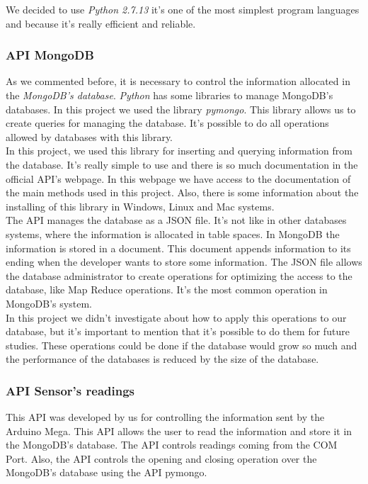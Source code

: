 We decided to use \textit{Python 2.7.13} it's one of the most simplest program languages and because it's really efficient and reliable.

\subsubsection{API MongoDB}

As we commented before, it is necessary to control the information allocated in the \textit{MongoDB's database}. \textit{Python} has some libraries to manage MongoDB's databases. In this project we used the library \textit{pymongo}. This library allows us to create queries for managing the database. It's possible to do all operations allowed by databases with this library.\\

In this project, we used this library for inserting and querying information from the database. It's really simple to use and there is so much documentation in the official API's webpage. In this webpage we have access to the documentation of the main methods used in this project. Also, there is some information about the installing of this library in Windows, Linux and Mac systems.\\

The API manages the database as a JSON file. It's not like in other databases systems, where the information is allocated in table spaces. In MongoDB the information is stored in a document. This document appends information to its ending when the developer wants to store some information. The JSON file allows the database administrator to create operations for optimizing the access to the database, like Map Reduce operations. It's the most common operation in MongoDB's system.\\

In this project we didn't investigate about how to apply this operations to our database, but it's important to mention that it's possible to do them for future studies. These operations could be done if the database would grow so much and the performance of the databases is reduced by the size of the database.

\subsubsection{API Sensor's readings}

This API was developed by us for controlling the information sent by the Arduino Mega. This API allows the user to read the information and store it in the MongoDB's database. The API controls readings coming from the COM Port. Also, the API controls the opening and closing operation over the MongoDB's database using the API pymongo.\\

